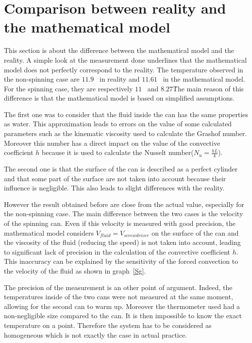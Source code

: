 \documentclass{report}
\begin{document}
	\chapter[Reality and mathematical model]{Comparison between reality and the mathematical model}\label{rvmm}
	
	This section is about the difference between the mathematical model and the reality. A simple look at the measurement done underlines that the mathematical model does not perfectly correspond to the reality. The temperature observed in the non-spinning case are $11.9$ \textcelsius\ in reality and $11.61$ \textcelsius\ in the mathematical model. For the spinning case, they are respectively $11$ \textcelsius\  and $8.27$\textcelsius\.
	The main reason of this difference is that the mathematical model is based on simplified assumptions.
	
	The first one was to consider that the fluid inside	the can has the same properties as water. This approximation leads to errors on the value of some calculated parameters such as the kinematic viscosity	used to calculate the Grashof number. Moreover this number has a direct impact on the value of the convective coefficient $h$ because it is used to calculate the Nusselt number($N_{u}=\frac{hL}{k}$). 
	
	The second one is that the surface of the can is described as a perfect cylinder and that some part of the surface are not taken into account because their influence is negligible. This also leads to slight differences with the reality.
	
	However the result obtained before are close from the actual value, especially for the non-spinning case. The main difference	between the two cases is the velocity of the spinning can. Even if this velocity is measured with good precision, the mathematical model considers $V_{fluid}=V_{screwdriver}$ on the surface of the can and the viscosity of the fluid (reducing the speed) is not taken into account, leading to significant lack of precision in the calculation of the convective coefficient $h$. This inaccuracy can be explained by the sensitivity of the forced convection to the velocity of the fluid as shown in graph~\ref{Sg}.


	The precision of the measurement is an other point of argument. Indeed, the temperatures inside of the two cans were not measured at the same moment, allowing for the second can to warm up. Moreover the thermometer used had a non-negligible size compared to the can. It is then impossible to know the exact temperature on a point.
	Therefore the system has to be considered as homogeneous which is not exactly the case in actual practice.
\end{document}

